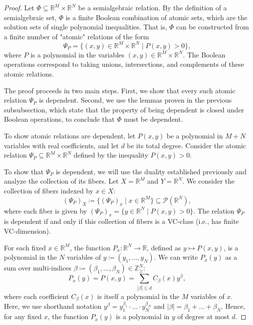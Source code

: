 \begin{proof}

    Let $\Phi \subseteq \mathbb{R}^M \times \mathbb{R}^N$ be a semialgebraic relation. By the definition of a semialgebraic set, $\Phi$ is a finite Boolean combination of atomic sets, which are the solution sets of single polynomial inequalities. That is, $\Phi$ can be constructed from a finite number of "atomic" relations of the form
    \[
        \Psi_P = \{(x, y) \in \mathbb{R}^M \times \mathbb{R}^N \mid P(x, y) > 0\},
    \]
    where $P$ is a polynomial in the variables $(x, y) \in \mathbb{R}^M \times \mathbb{R}^N$. The Boolean operations correspond to taking unions, intersections, and complements of these atomic relations.

    The proof proceeds in two main steps. First, we show that every such atomic relation $\Psi_P$ is dependent. Second, we use the lemmas proven in the previous subsubsection, which state that the property of being dependent is closed under Boolean operations, to conclude that $\Phi$ must be dependent.

    To show atomic relations are dependent, let $P(x, y)$ be a polynomial in $M+N$ variables with real coefficients, and let $d$ be its total degree. Consider the atomic relation $\Psi_P \subseteq \mathbb{R}^M \times \mathbb{R}^N$ defined by the inequality $P(x, y) > 0$.

    To show that $\Psi_P$ is dependent, we will use the duality established previously and analyze the collection of its fibers. Let $X = \mathbb{R}^M$ and $Y = \mathbb{R}^N$. We consider the collection of fibers indexed by $x \in X$:
    \[
        (\Psi_P)_X \coloneqq \{(\Psi_P)_x \mid x \in \mathbb{R}^M\} \subseteq \mathcal{P}(\mathbb{R}^N),
    \]
    where each fiber is given by $(\Psi_P)_x = \{y \in \mathbb{R}^N \mid P(x, y) > 0\}$. The relation $\Psi_P$ is dependent if and only if this collection of fibers is a VC-class (i.e., has finite VC-dimension).

    For each fixed $x \in \mathbb{R}^M$, the function $P_x: \mathbb{R}^N \to \mathbb{R}$, defined as $y \mapsto P(x, y)$, is a polynomial in the $N$ variables of $y\coloneq  (y_1, \dots, y_N)$. We can write $P_x(y)$ as a sum over multi-indices $\beta \coloneq(\beta_1, \dots, \beta_N) \in \mathbb{Z}_{\geq}^N$:
    \[
        P_x(y) = P(x, y) = \sum_{|\beta| \le d} C_\beta(x) y^\beta,
    \]
    where each coefficient $C_\beta(x)$ is itself a polynomial in the $M$ variables of $x$. Here, we use shorthand notation $y^{\beta} = y_1^{\beta_1}\cdot\dots\cdot y_N^{\beta_N}$ and $|\beta| = \beta_1 + \dots + \beta_N$.
    Hence, for any fixed $x$, the function $P_x(y)$ is a polynomial in $y$ of degree at most $d$.


\end{proof}
